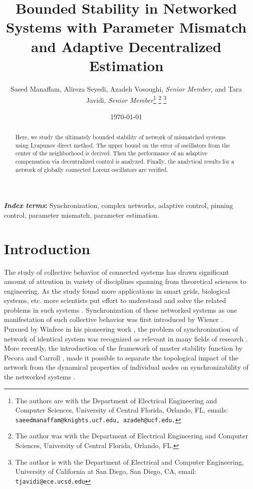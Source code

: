 \documentclass[conference]{IEEEtran}
\begin{document}
\title{\vspace{18pt}Bounded Stability in Networked Systems with Parameter Mismatch and Adaptive Decentralized Estimation}
\author{Saeed Manaffam, Alireza Seyedi, Azadeh Vosoughi, {\em Senior Member}, and Tara Javidi, {\em Senior Member}\thanks{ The authors are with the Department of Electrical Engineering and Computer Sciences, University of Central Florida, Orlando, FL, emails: {\tt\small saeedmanaffam@knights.ucf.edu, azadeh@ucf.edu.}}
\thanks{ The author was with the Department of Electrical Engineering and Computer Sciences, University of Central Florida, Orlando, FL.}
\thanks{ The author is with the Department of Electrical and Computer Engineering, University of California at San Diego, San Diego, CA, email: {\tt\small tjavidi@ece.ucsd.edu}}
}

\maketitle
\date{\today}

\begin{abstract}
	Here, we study the ultimately bounded stability of network of mismatched systems using Lyapunov direct method. The upper bound on the error of oscillators from the center of the neighborhood is derived. Then the performance of an adaptive  compensation via decentralized control is analyzed. Finally, the analytical results for a network of globally connected Lorenz oscillators are verified. 
\end{abstract}

\textbf{\textit{Index terms}:} Synchronization, complex networks, adaptive control, pinning control, parameter mismatch, parameter estimation.




\section{Introduction}

The study of collective behavior of connected systems has drawn significant amount of attention in variety of disciplines spanning from theoretical sciences to engineering. As the study found more applications in smart grids, biological systems, etc. more scientists put effort to understand and solve the related problems in such systems \cite{Wiener65, Winfree67,Arenas08,  Watts98,Pecora98,Motter07,Manaffam13,Wang02,Zhou06,Shahrasbi11a,Shahrasbi11b,Sani14,Chen07,Manaffam13a,Yu09,Manaffam13b,Newman10}. Synchronization of these networked systems as one manifestation of such collective behavior was first introduced by Wiener \cite{Wiener65}. Pursued by Winfree in his pioneering work \cite{Winfree67}, the problem of synchronization of network of identical system was recognized as relevant in many fields of research \cite{Wiener65, Winfree67,Arenas08,  Watts98}. More recently, the introduction of the framework of master stability function by Pecora and Carroll \cite{Pecora98}, made it possible to separate the topological impact of the network from the dynamical properties of individual nodes on synchronizability of the networked systems \cite{Pecora98}\cite{Motter07}. 
\end{document}

